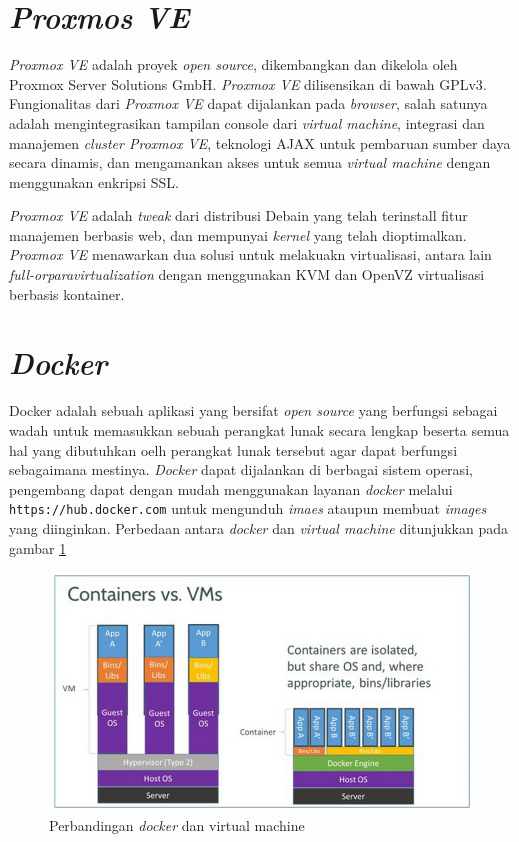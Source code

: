 	\section{\textit{Proxmos VE}}
	\textit{Proxmox VE} adalah proyek \textit{open source}, dikembangkan dan dikelola oleh Proxmox Server Solutions GmbH. \textit{Proxmox VE} dilisensikan di bawah GPLv3. Fungionalitas dari \textit{Proxmox VE} dapat dijalankan pada \textit{browser}, salah satunya adalah mengintegrasikan tampilan console dari \textit{virtual machine}, integrasi dan manajemen \textit{cluster Proxmox VE}, teknologi AJAX untuk pembaruan sumber daya secara dinamis, dan mengamankan akses untuk semua \textit{virtual machine} dengan menggunakan enkripsi SSL.
	
	\textit{Proxmox VE} adalah \textit{tweak} dari distribusi Debain yang telah terinstall fitur manajemen berbasis web, dan mempunyai \textit{kernel} yang telah dioptimalkan. \textit{Proxmox VE} menawarkan dua solusi untuk melakuakn virtualisasi, antara lain \textit{full-orparavirtualization} dengan menggunakan KVM dan OpenVZ virtualisasi berbasis kontainer.
		
	\section{\textit{Docker}}
	Docker adalah sebuah aplikasi yang bersifat \textit{open source} yang berfungsi sebagai wadah untuk memasukkan sebuah perangkat lunak secara lengkap beserta semua hal yang dibutuhkan oelh perangkat lunak tersebut agar dapat berfungsi sebagaimana mestinya. \textit{Docker} dapat dijalankan di berbagai sistem operasi, pengembang dapat dengan mudah menggunakan layanan \textit{docker} melalui \texttt{https://hub.docker.com} untuk mengunduh \textit{imaes} ataupun membuat \textit{images} yang diinginkan. Perbedaan antara \textit{docker} dan \textit{virtual machine} ditunjukkan pada gambar \ref{contohDocker}
	
	\begin{figure}[H] %
	\centering
	\includegraphics[width=\linewidth]{images/bab2/docker-vm-container}
	\caption{Perbandingan \textit{docker} dan virtual machine}
	\label{contohDocker}
	\end{figure}
	
